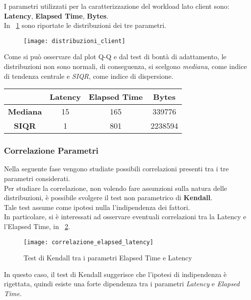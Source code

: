 I parametri utilizzati per la caratterizzazione del workload lato client sono:
\textbf{Latency}, \textbf{Elapsed Time}, \textbf{Bytes}.\\

In \figurename~\ref{distribuzioni_parametri} sono riportate le distribuzioni dei
tre parametri.\\

\begin{figure}[!htbp]
  \centering
  \texttt{[image: distribuzioni\_client]}
  \caption{}
  \label{distribuzioni_parametri}
\end{figure}

Come si può osservare dal plot Q-Q e dal test di bontà di adattamento, le distribuzioni
non sono normali, di conseguenza, si scelgono \textit{mediana}, come indice di
tendenza centrale e \textit{SIQR}, come indice di dispersione.\\

\begin{center}
	\begin{tabular}{c|c|c|c|}
		& \textbf{Latency} & \textbf{Elapsed Time} & \textbf{Bytes} \\
		\hline
		\textbf{Mediana} & 15 & 165 & 339776 \\
		\hline
		\textbf{SIQR} & 1 & 801 & 2238594 \\
		\hline
	\end{tabular}
\end{center}

\subsubsection*{Correlazione Parametri}
Nella seguente fase vengono studiate possibili correlazioni presenti tra i tre
parametri considerati.\\
Per studiare la correlazione, non volendo fare assunzioni sulla natura delle
distribuzioni, è possibile svolgere il test non parametrico di \textbf{Kendall}.\\
Tale test assume come ipotesi nulla l'indipendenza dei fattori.\\
In particolare, si è interessati ad osservare eventuali correlazioni tra la Latency
e l'Elapsed Time, in \figurename~\ref{correlazione_elapsed_latency}.\\
\begin{figure}[!htbp]
  \centering
  \texttt{[image: correlazione\_elapsed\_latency]}
  \caption{Test di Kendall tra i parametri Elapsed Time e Latency}
  \label{correlazione_elapsed_latency}
\end{figure}

In questo caso, il test di Kendall suggerisce che l'ipotesi di indipendenza è
rigettata, quindi esiste una forte dipendenza tra i parametri \textit{Latency} e
\textit{Elapsed Time}.
